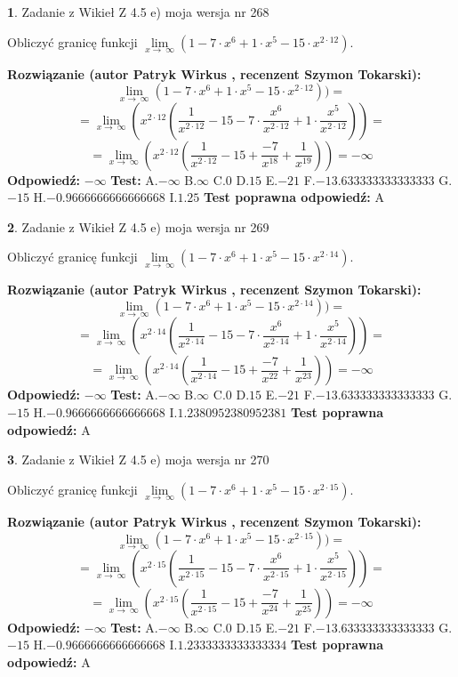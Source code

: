 \documentclass[12pt, a4paper]{article}
\theoremstyle{definition} %
\newtheorem{zad}{}
\newcommand{\zadStart}[1]{\begin{zad}#1\newline}
\newcommand{\zadStop}{\end{zad}}
\newcommand{\rozwStart}[2]{\noindent \textbf{Rozwiązanie (autor #1 , recenzent #2): }\newline}
\newcommand{\rozwStop}{\newline}
\newcommand{\odpStart}{\noindent \textbf{Odpowiedź:}\newline}
\newcommand{\odpStop}{\newline}
\newcommand{\testStart}{\noindent \textbf{Test:}\newline}
\newcommand{\testStop}{\newline}
\newcommand{\kluczStart}{\noindent \textbf{Test poprawna odpowiedź:}\newline}
\newcommand{\kluczStop}{\newline}
\begin{document}
\zadStart{Zadanie z Wikieł Z 4.5 e) moja wersja nr 268}


Obliczyć granicę funkcji  $\lim\limits_{x\to\ \infty}(1 - 7 \cdot x^{6}+1 \cdot x^{5}- 15 \cdot x^{2\cdot12})$.
\zadStop
\rozwStart{Patryk Wirkus}{Szymon Tokarski}
$$\lim\limits_{x\to\ \infty}(1 - 7 \cdot x^{6}+1 \cdot x^{5}- 15 \cdot x^{2\cdot12}))=$$
$$=\lim\limits_{x\to\ \infty}(x^{2\cdot12}(\frac{1}{x^{2\cdot12}}-15 -7 \cdot \frac{x^{6}}{x^{2\cdot12}}+1 \cdot \frac{x^{5}}{x^{2\cdot12}}))=$$
$$=\lim\limits_{x\to\ \infty}(x^{2\cdot12}(\frac{1}{x^{2\cdot12}}-15 + \frac{-7}{x^{18}}+ \frac{1}{x^{19}}))=-\infty$$
\rozwStop
\odpStart
$-\infty$
\odpStop
\testStart
A.$-\infty$ B.$\infty$ C.$0$ D.$15$ E.$-21$
F.$-13.633333333333333$ G.$-15$
H.$-0.9666666666666668$
I.$1.25$
\testStop
\kluczStart
A
\kluczStop



\zadStart{Zadanie z Wikieł Z 4.5 e) moja wersja nr 269}


Obliczyć granicę funkcji  $\lim\limits_{x\to\ \infty}(1 - 7 \cdot x^{6}+1 \cdot x^{5}- 15 \cdot x^{2\cdot14})$.
\zadStop
\rozwStart{Patryk Wirkus}{Szymon Tokarski}
$$\lim\limits_{x\to\ \infty}(1 - 7 \cdot x^{6}+1 \cdot x^{5}- 15 \cdot x^{2\cdot14}))=$$
$$=\lim\limits_{x\to\ \infty}(x^{2\cdot14}(\frac{1}{x^{2\cdot14}}-15 -7 \cdot \frac{x^{6}}{x^{2\cdot14}}+1 \cdot \frac{x^{5}}{x^{2\cdot14}}))=$$
$$=\lim\limits_{x\to\ \infty}(x^{2\cdot14}(\frac{1}{x^{2\cdot14}}-15 + \frac{-7}{x^{22}}+ \frac{1}{x^{23}}))=-\infty$$
\rozwStop
\odpStart
$-\infty$
\odpStop
\testStart
A.$-\infty$ B.$\infty$ C.$0$ D.$15$ E.$-21$
F.$-13.633333333333333$ G.$-15$
H.$-0.9666666666666668$
I.$1.2380952380952381$
\testStop
\kluczStart
A
\kluczStop



\zadStart{Zadanie z Wikieł Z 4.5 e) moja wersja nr 270}


Obliczyć granicę funkcji  $\lim\limits_{x\to\ \infty}(1 - 7 \cdot x^{6}+1 \cdot x^{5}- 15 \cdot x^{2\cdot15})$.
\zadStop
\rozwStart{Patryk Wirkus}{Szymon Tokarski}
$$\lim\limits_{x\to\ \infty}(1 - 7 \cdot x^{6}+1 \cdot x^{5}- 15 \cdot x^{2\cdot15}))=$$
$$=\lim\limits_{x\to\ \infty}(x^{2\cdot15}(\frac{1}{x^{2\cdot15}}-15 -7 \cdot \frac{x^{6}}{x^{2\cdot15}}+1 \cdot \frac{x^{5}}{x^{2\cdot15}}))=$$
$$=\lim\limits_{x\to\ \infty}(x^{2\cdot15}(\frac{1}{x^{2\cdot15}}-15 + \frac{-7}{x^{24}}+ \frac{1}{x^{25}}))=-\infty$$
\rozwStop
\odpStart
$-\infty$
\odpStop
\testStart
A.$-\infty$ B.$\infty$ C.$0$ D.$15$ E.$-21$
F.$-13.633333333333333$ G.$-15$
H.$-0.9666666666666668$
I.$1.2333333333333334$
\testStop
\kluczStart
A
\kluczStop
\end{document}
